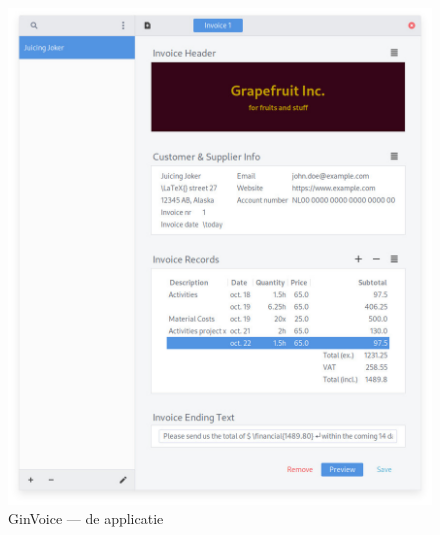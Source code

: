 \begin{figure}[!h]
    \includegraphics[width=\linewidth]{ginvoice/app.jpg}
    \caption{GinVoice — de applicatie}\label{fig:app}
\end{figure}


